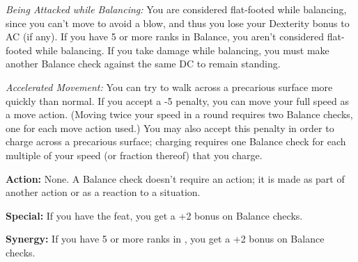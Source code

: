 \textit{Being Attacked while Balancing:} You are considered flat-footed while balancing, 
since you can't move to avoid a blow, and thus you lose your Dexterity bonus to 
AC (if any). If you have 5 or more ranks in Balance, you aren't considered flat-footed 
while balancing. If you take damage while balancing, you must make another Balance 
check against the same DC to remain standing.

\textit{Accelerated Movement:} You can try to walk across a precarious surface 
more quickly than normal. If you accept a -5 penalty, you can move your full speed 
as a move action. (Moving twice your speed in a round requires two Balance checks, 
one for each move action used.) You may also accept this penalty in order to charge 
across a precarious surface; charging requires one Balance check for each multiple 
of your speed (or fraction thereof) that you charge.

\textbf{Action:} None. A Balance check doesn't require an action; it is made as 
part of another action or as a reaction to a situation.

\textbf{Special:} If you have the  feat, you get a +2 bonus on Balance checks.

\textbf{Synergy:} If you have 5 or more ranks in , you get a +2 bonus on 
Balance checks.

